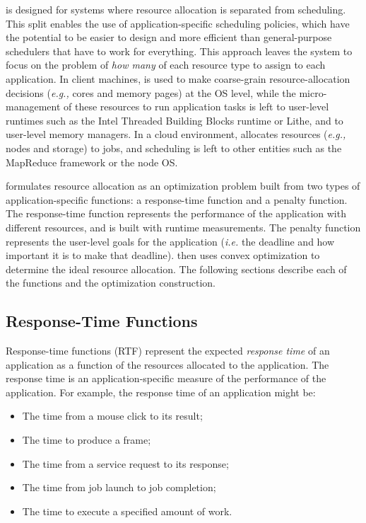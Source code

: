 \pacora is designed for systems where resource allocation is separated
from scheduling.  This split enables the use of application-specific
scheduling policies, which have the potential to be easier to design
and more efficient than general-purpose schedulers that have to work
for everything.  This approach leaves the system to focus on the
problem of \emph{how many} of each resource type to assign to each
application.  In client machines, \pacora is used to make coarse-grain
resource-allocation decisions (\emph{e.g.,} cores and memory pages) at
the OS level, while the micro-management of these resources to run
application tasks is left to user-level runtimes such as the Intel
Threaded Building Blocks runtime\cite{CoMa08} or Lithe\cite{lithe},
and to user-level memory managers.  In a cloud environment, \pacora
allocates resources (\emph{e.g.,} nodes and storage) to jobs, and
scheduling is left to other entities such as the MapReduce
framework\cite{mapreduce} or the node OS.

\pacora formulates resource allocation as an optimization problem
built from two types of application-specific functions: a
response-time function and a penalty function. The response-time
function represents the performance of the application with different
resources, and is built with runtime measurements.  The penalty
function represents the user-level goals for the application
(\emph{i.e.} the deadline and how important it is to make that
deadline). \pacora then uses convex optimization\cite{BoVa} to
determine the ideal resource allocation.  The following sections
describe each of the functions and the optimization construction.

\subsection*{Response-Time Functions}

Response-time functions (RTF) represent the expected \emph{response
  time} of an application as a function of the resources allocated to
the application. The response time is an application-specific measure
of the performance of the application.  For example, the response time
of an application might be:
    \begin{itemize}\itemsep0pt \parskip0pt 
    \item The time from a mouse click to its result;
    \item The time to produce a frame;
    \item The time from a service request to its response;
    \item The time from job launch to job completion;
    \item The time to execute a specified amount of work.
    \end{itemize}

